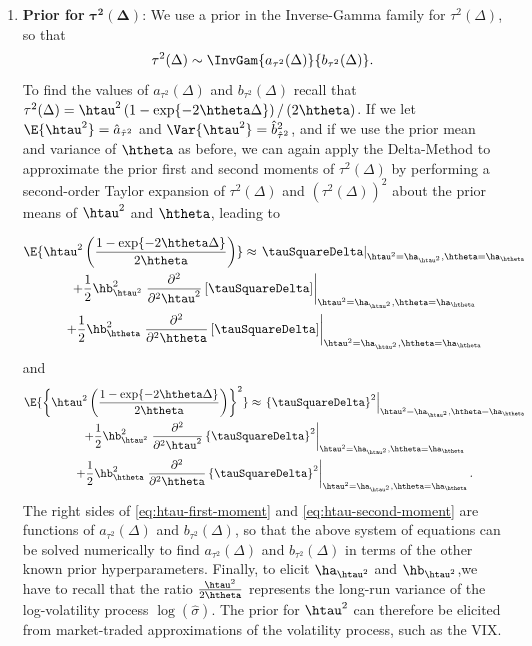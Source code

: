 \begin{enumerate}
\item{\textbf{Prior for} $\boldsymbol{\tau^2}(\boldsymbol{\Delta})$:} We use a prior in the Inverse-Gamma family for $\tau^2(\Delta)$, so that
$$
\tau^2(\Delta) \sim \InvGam{ a_{\tau^2}(\Delta)}{b_{\tau^2}(\Delta) }.
$$
To find the values of $a_{\tau^2}(\Delta)$ and $b_{\tau^2}(\Delta)$ recall that $\tau^2(\Delta) = \htau^2 \left( 1 - \exp\{ -2\htheta \Delta \} \right)/ \left( 2\htheta \right)$.  If we let $\E{\htau^2} = \hat{a}_{\hat{\tau}^2}$ and $\Var{\htau^2} = \hat{b}^2_{\hat{\tau}^2}$, and if we use the prior mean and variance of $\htheta$ as before, we can again apply the Delta-Method to approximate the prior first and second moments of $\tau^2(\Delta)$ by performing a second-order Taylor expansion of $\tau^2(\Delta)$ and $(\tau^2(\Delta))^2$ about the prior means of $\htau^2$ and $\htheta$, leading to

\begin{multline} \label{eq:htau-first-moment}
\E{\htau^2 \left( \frac{1 - \exp\{ -2\htheta \Delta  \}}{2\htheta} \right)} \approx  \left. \tauSquareDelta \right|_{\htau^2 =  \ha_{\htau^2}, \htheta = \ha_{\htheta}}   \\
%
+  \frac{1}{2} \hb^2_{\htau^2}  \left. \frac{\partial^2}{\partial^2 \htau^2} \left[ \tauSquareDelta \right] \right|_{\htau^2 = \ha_{\htau^2}, \htheta = \ha_{\htheta}}   \\
+  \frac{1}{2} \hb^2_{\htheta}  \left. \frac{\partial^2}{\partial^2 \htheta} \left[ \tauSquareDelta \right] \right|_{\htau^2 = \ha_{\htau^2}, \htheta = \ha_{\htheta}}
\end{multline}
and
\begin{multline}  \label{eq:htau-second-moment}
\E{\left\{\htau^2 \left( \frac{1 - \exp\{ -2\htheta \Delta \}}{2\htheta} \right) \right\}^2} \approx  \left. \left\{ \tauSquareDelta\right\}^2 \right|_{\htau^2 = \ha_{\htau^2}, \htheta = \ha_{\htheta}}   \\
%
+  \frac{1}{2} \hb^2_{\htau^2}   \left. \frac{\partial^2}{\partial^2 \htau^2} \left\{ \tauSquareDelta \right\}^2 \right|_{\htau^2 = \ha_{\htau^2}, \htheta = \ha_{\htheta}}  \\
%
+  \frac{1}{2} \hb^2_{\htheta}   \left. \frac{\partial^2}{\partial^2 \htheta} \left\{ \tauSquareDelta \right\}^2 \right|_{\htau^2 = \ha_{\htau^2}, \htheta = \ha_{\htheta}}    .
\end{multline}
The right sides of \eqref{eq:htau-first-moment} and \eqref{eq:htau-second-moment} are functions of $a_{\tau^2}(\Delta)$ and $b_{\tau^2}(\Delta)$, so that the above system of equations can be solved numerically to find $a_{\tau^2}(\Delta)$ and $b_{\tau^2}(\Delta)$ in terms of the other known prior hyperparameters. Finally, to elicit $\ha_{\htau^2}$ and $\hb_{\htau^2}$,we have to recall that the ratio $\frac{\htau^2}{2\htheta}$ represents the long-run variance of the log-volatility process $\log(\hat{\sigma})$. The prior for $\htau^2$ can therefore be elicited from market-traded approximations of the volatility process, such as the VIX.



\end{enumerate}
